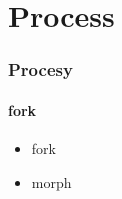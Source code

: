 \documentclass[10pt]{beamer}
\begin{document}
\section{Process}

\begin{frame}[fragile]
	\frametitle{Procesy}
	\framesubtitle{fork}
  \begin{itemize}
    \item fork
    \item morph
  \end{itemize}


\end{frame}
\end{document}
